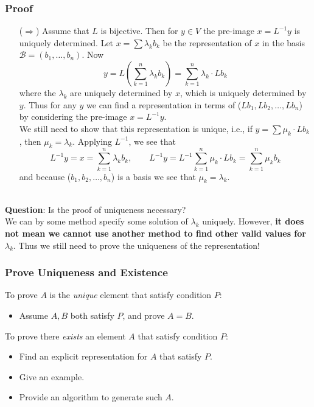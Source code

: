 \documentclass[12pt, t]{beamer}
\renewcommand{\emph}[1]{{\color{Turquoise3}\textsl{#1}}}
\newcommand{\myseries}[2]{$#1_1,#1_2,\dots,#1_#2$}
\newcommand{\nullspace}{~\\[15pt]}
\begin{document}
\begin{frame}
    \frametitle{Proof}
    \tiny
    \begin{itemize}
        \item[($\Rightarrow$)] Assume that $L$ is bijective. Then for $y\in V$ the pre-image $x=L^{-1}y$ is uniquely determined. Let $x=\sum\lambda_kb_k$ be the representation of $x$ in the basis $\mathcal{B}=(b_1,\ldots,b_n)$. Now
              \[y=L\left(\sum_{k=1}^{n}\lambda_kb_k\right)=\sum_{k=1}^{n}\lambda_k\cdot Lb_k\]
              where the $\lambda_k$ are uniquely determined by $x$, which is uniquely determined by $y$. Thus for any $y$ we can find a representation in terms of (\myseries{Lb}{n}) by considering the pre-image $x=L^{-1}y$.\\
              We still need to show that this representation is unique, i.e., if $y=\sum\mu_k\cdot Lb_k$, then $\mu_k=\lambda_k$. Applying $L^{-1}$, we see that
              \[L^{-1}y=x=\sum_{k=1}^{n}\lambda_kb_k,\qquad
                  L^{-1}y=L^{-1}\sum_{k=1}^{n}\mu_k\cdot Lb_k=\sum_{k=1}^{n}\mu_kb_k\]
              and because (\myseries{b}{n}) is a basis we see that $\mu_k=\lambda_k$.
    \end{itemize}
    \nullspace \small
    \textbf{Question}: Is the proof of uniqueness necessary?\\[9pt]
    \pause
    We can by some method specify some solution of $\lambda_k$ uniquely. However, \textbf{it does not mean we cannot use another method to find other valid values for $\lambda_k$}. Thus we still need to prove the uniqueness of the representation!
\end{frame}

\begin{frame}
    \frametitle{Prove Uniqueness and Existence}
    To prove $A$ is the \emph{unique} element that satisfy condition $P$:
    \begin{itemize}
        \item Assume $A,B$ both satisfy $P$, and prove $A=B$.
    \end{itemize}
    To prove there \emph{exists} an element $A$ that satisfy condition $P$:
    \begin{itemize}
        \item Find an explicit representation for $A$ that satisfy $P$.
        \item Give an example.
        \item Provide an algorithm to generate such $A$.
    \end{itemize}
\end{frame}
\end{document}
